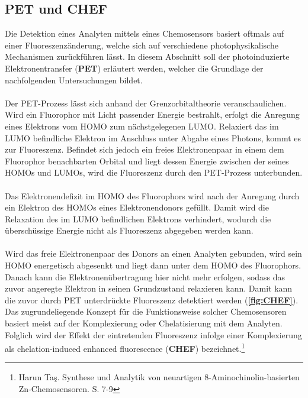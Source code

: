 \documentclass[12pt,a4paper]{report}
\begin{document}
	\subsection{PET und CHEF}
	Die Detektion eines Analyten mittels eines Chemosensors basiert oftmals auf einer Fluoreszenzänderung, welche sich auf  verschiedene photophysikalische Mechanismen zurückführen lässt. In diesem Abschnitt soll der \textnormal{photoinduzierte Elektronentransfer} (\textbf{PET}) erläutert werden, welcher die Grundlage der nachfolgenden Untersuchungen bildet.\\
	\ \\
	Der PET-Prozess lässt sich anhand der Grenzorbitaltheorie veranschaulichen. Wird ein Fluorophor mit Licht passender Energie bestrahlt, erfolgt die Anregung eines Elektrons vom HOMO zum nächstgelegenen LUMO. Relaxiert das im LUMO befindliche Elektron im Anschluss unter Abgabe eines Photons, kommt es zur Fluoreszenz. Befindet sich jedoch ein freies Elektronenpaar in einem dem Fluorophor benachbarten Orbital und liegt dessen Energie zwischen der seines HOMOs und LUMOs,  wird die Fluoreszenz durch den PET-Prozess unterbunden.\\
	\ \\
	Das Elektronendefizit im HOMO des Fluorophors wird nach der Anregung durch ein Elektron des HOMOs eines Elektronendonors gefüllt. Damit wird die Relaxation des im LUMO befindlichen Elektrons verhindert, wodurch die überschüssige Energie nicht als Fluoreszenz abgegeben werden kann.\\
	\ \\
	Wird das freie Elektronenpaar des Donors an einen Analyten gebunden, wird sein HOMO energetisch abgesenkt und liegt dann unter dem HOMO des Fluorophors. Danach kann die Elektronenübertragung  hier nicht mehr erfolgen, sodass das zuvor angeregte Elektron in seinen Grundzustand relaxieren kann. Damit kann die zuvor durch PET unterdrückte Fluoreszenz detektiert werden (\textbf{\autoref{fig:CHEF}}). Das zugrundeliegende Konzept für die Funktionsweise solcher Chemosensoren basiert meist auf der 
	Komplexierung oder Chelatisierung mit dem Analyten. Folglich wird der Effekt der eintretenden Fluoreszenz infolge einer Komplexierung 
	als \textnormal{ chelation-induced enhanced fluorescence} (\textbf{CHEF}) bezeichnet.\footnote{Harun Taş. Synthese und Analytik von neuartigen
	8-Aminochinolin-basierten Zn-Chemosensoren. S. 7-9}
	\newpage 
\end{document}
